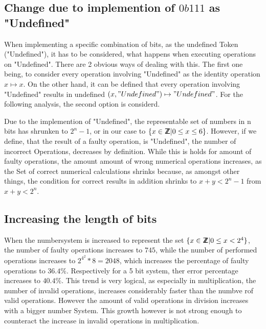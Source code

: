 \documentclass{aiaa-tc}
\newcommand*{\ZZ}{%
  \textsf{Z\kern-1ex Z}%
}
\begin{document}
\subsection{Change due to implemention of $0b111$ as "Undefined"}
When implementing a specific combination of bits, as the undefined Token ("Undefined"), it has to be considered, what happens when executing operations on "Undefined".
There are 2 obvious ways of dealing with this. The first one being, to consider every operation involving "Undefined" as the identity operation $ x \mapsto x$.
On the other hand, it can be defined that every operation involving "Undefined" results in undefined $(x, "Undefined") \mapsto "Undefined"$.
For the following analysis, the second option is considerd. \par
Due to the implemention of "Undefined", the representable set of numbers in n bits has shrunken to $2^n -1$, or in our case to $ \{ x \in \ZZ | 0 \leq x \leq 6 \} $.
However, if we define, that the result of a faulty operation, is "Undefined", the number of incorrect Operations, decreases by definition. While this is holds for amount
of faulty operations, the amount amount of wrong numerical operations increases, as the Set of correct numerical calculations shrinks because, as amongst other things,
the condition for correct results in addition shrinks to $x + y < 2^n - 1$ from $x + y < 2^n$.

\subsection{Increasing the length of bits}
When the numbersystem is increased to represent the set $ \{ x \in \ZZ | 0 \leq x < 2^4 \} $, the number of faulty operations increases to $745$, while the number of 
performed operations increases to $2^{4^{2}} * 8 = 2048$, which increases the percentage of faulty operations to $36.4 \% $. Respectively for a 5 bit system, ther error
percentage increases to $40.4 \%$. This trend is very logical, as especially in multiplication, the number of invalid operations, increases considerably faster than the
numbve rof valid operations. However the amount of valid operations in division increases with a bigger number System. This growth however is not strong enough to counteract
the increase in invalid operations in multiplication.
\end{document}
